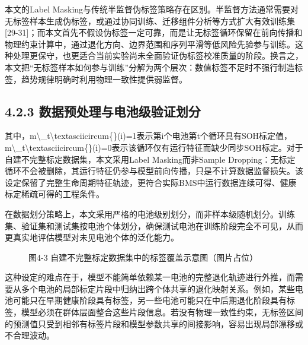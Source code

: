 \documentclass[12pt, a4paper]{ctexart}
\begin{document}
本文的Label Masking与传统半监督伪标签策略存在区别。半监督方法通常需要对无标签样本生成伪标签，或通过协同训练、迁移组件分析等方式扩大有效训练集[29-31]；而本文首先不假设伪标签一定可靠，而是让无标签循环保留在前向传播和物理约束计算中，通过退化方向、边界范围和序列平滑等低风险先验参与训练。这种处理更保守，也更适合当前实验尚未全面验证伪标签校准质量的阶段。换言之，本文把“无标签样本如何参与训练”分解为两个层次：数值标签不足时不强行制造标签，趋势规律明确时利用物理一致性提供弱监督。



\subsection{4.2.3 数据预处理与电池级验证划分}

其中，m\textbackslash{}\_t\textbackslash{}textasciicircum\{\}(i)=1表示第i个电池第t个循环具有SOH标定值，m\textbackslash{}\_t\textbackslash{}textasciicircum\{\}(i)=0表示该循环仅有运行特征而缺少同步SOH标定。对于自建不完整标定数据集，本文采用Label Masking而非Sample Dropping：无标定循环不会被删除，其运行特征仍参与模型前向传播，只是不计算数据监督损失。该设定保留了完整生命周期特征轨迹，更符合实际BMS中运行数据连续可得、健康标定稀疏可得的工程条件。


在数据划分策略上，本文采用严格的电池级别划分，而非样本级随机划分。训练集、验证集和测试集按电池个体划分，确保测试电池在训练阶段完全不可见，从而更真实地评估模型对未见电池个体的泛化能力。



\begin{figure}[H]
  \centering
  \caption{图4-3  自建不完整标定数据集中的标签覆盖示意图（图片占位）}
  \label{fig:}
\end{figure}


这种设定的难点在于，模型不能简单依赖某一电池的完整退化轨迹进行外推，而需要从多个电池的局部标定片段中归纳出跨个体共享的退化映射关系。例如，某些电池可能只在早期健康阶段具有标签，另一些电池可能只在中后期退化阶段具有标签，模型必须在群体层面整合这些片段信息。若没有物理一致性约束，无标签区间的预测值只受到相邻有标签片段和模型参数共享的间接影响，容易出现局部漂移或不合理波动。
\end{document}

